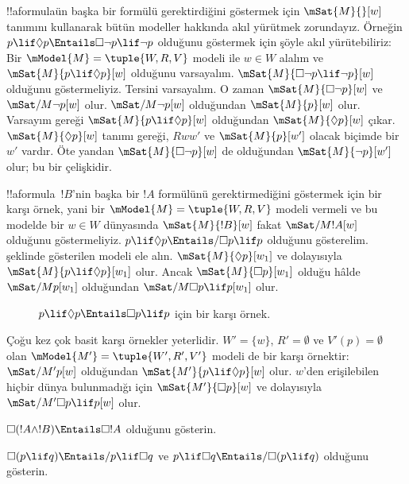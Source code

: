 \begin{ex}
  !!a{formula}{}ün başka bir formülü gerektirdiğini göstermek için
  $\mSat{M}{}[w]$ tanımını kullanarak bütün modeller hakkında akıl yürütmek
  zorundayız. Örneğin $p \lif \Diamond p \Entails \Box\lnot p \lif \lnot
  p$ olduğunu göstermek için şöyle akıl yürütebiliriz: Bir
  $\mModel{M} = \tuple{W, R, V}$ modeli ile $w \in W$ alalım ve
  $\mSat{M}{p \lif \Diamond p}[w]$ olduğunu varsayalım.
  $\mSat{M}{\Box\lnot p \lif \lnot p}[w]$ olduğunu göstermeliyiz. Tersini
  varsayalım. O zaman $\mSat{M}{\Box\lnot p}[w]$ ve
  $\mSat/{M}{\lnot p}[w]$ olur. $\mSat/{M}{\lnot p}[w]$ olduğundan
  $\mSat{M}{p}[w]$ olur. Varsayım gereği $\mSat{M}{p \lif \Diamond
  p}[w]$ olduğundan $\mSat{M}{\Diamond p}[w]$ çıkar. $\mSat{M}{\Diamond
  p}[w]$ tanımı gereği, $Rww'$ ve $\mSat{M}{p}[w']$ olacak biçimde bir
  $w'$ vardır. Öte yandan $\mSat{M}{\Box \lnot p}[w]$ de olduğundan
  $\mSat{M}{\lnot p}[w']$ olur; bu bir çelişkidir.

  !!a{formula}~$!B$'nin başka bir $!A$ formülünü gerektirmediğini
  göstermek için bir karşı örnek, yani bir $\mModel{M} = \tuple{W, R,
    V}$ modeli vermeli ve bu modelde bir $w \in W$ dünyasında
  $\mSat{M}{!B}[w]$ fakat $\mSat/{M}{!A}[w]$ olduğunu göstermeliyiz.
  $p \lif \Diamond p \Entails/ \Box p \lif p$ olduğunu gösterelim.
   şeklinde gösterilen modeli ele alın.
  $\mSat{M}{\Diamond
  p}[w_1]$ ve dolayısıyla $\mSat{M}{p \lif \Diamond p}[w_1]$ olur. Ancak
  $\mSat{M}{\Box p}[w_1]$ olduğu hâlde $\mSat/{M}{p}[w_1]$ olduğundan
  $\mSat/{M}{\Box p \lif p}[w_1]$ olur.
  \begin{figure}
  \begin{center}
  \end{center}
  \caption{$p \lif \Diamond p \Entails \Box p \lif p$ için bir karşı
  örnek.}
  \end{figure}
  
  Çoğu kez çok basit karşı örnekler yeterlidir. $W' = \{w\}$,
  $R' = \emptyset$ ve $V'(p) = \emptyset$ olan $\mModel{M'} =
  \tuple{W', R', V'}$ modeli de bir karşı örnektir: $\mSat/{M'}{p}[w]$
  olduğundan $\mSat{M'}{p \lif \Diamond p}[w]$ olur. $w$'den erişilebilen
  hiçbir dünya bulunmadığı için $\mSat{M'}{\Box p}[w]$ ve dolayısıyla
  $\mSat/{M'}{\Box p \lif p}[w]$ olur.
\end{ex}

\begin{prob}
  $\Box (!A \land !B) \Entails \Box !A$ olduğunu gösterin.
\end{prob}

\begin{prob}
  $\Box (p \lif q) \Entails/ p \lif \Box q$ ve $p \lif \Box
  q \Entails/\Box (p \lif q)$ olduğunu gösterin.
\end{prob}

